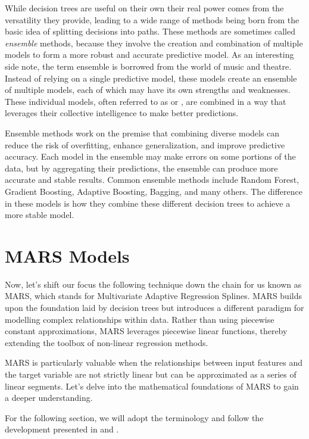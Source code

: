 While decision trees are useful on their own their real power comes from the versatility they provide, leading to a wide range of methods being born from the basic idea of splitting decisions into paths. These methods are sometimes called \textit{ensemble} methods, because they involve the creation and combination of multiple models to form a more robust and accurate predictive model. As an interesting side note, the term ensemble is borrowed from the world of music and theatre. Instead of relying on a single predictive model, these models create an ensemble of multiple models, each of which may have its own strengths and weaknesses. These individual models, often referred to as  or , are combined in a way that leverages their collective intelligence to make better predictions.

Ensemble methods work on the premise that combining diverse models can reduce the risk of overfitting, enhance generalization, and improve predictive accuracy. Each model in the ensemble may make errors on some portions of the data, but by aggregating their predictions, the ensemble can produce more accurate and stable results. Common ensemble methods include Random Forest, Gradient Boosting, Adaptive Boosting, Bagging, and many others. The difference in these models is how they combine these different decision trees to achieve a more stable model. 

\section{MARS Models}

Now, let's shift our focus the following technique down the chain for us known as MARS, which stands for Multivariate Adaptive Regression Splines. MARS builds upon the foundation laid by decision trees but introduces a different paradigm for modelling complex relationships within data. Rather than using piecewise constant approximations, MARS leverages piecewise linear functions, thereby extending the toolbox of non-linear regression methods.

MARS is particularly valuable when the relationships between input features and the target variable are not strictly linear but can be approximated as a series of linear segments. Let's delve into the mathematical foundations of MARS to gain a deeper understanding.

For the following section, we will adopt the terminology and follow the development presented in \cite{Friedman_1991} and \cite{friedman1991multivariate}.

